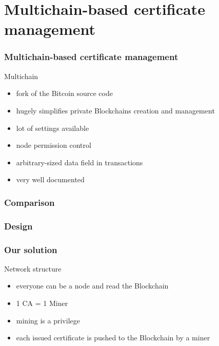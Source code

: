 \section[Multichain-based certificate verification]{Multichain-based certificate management}
\begin{frame}
\frametitle{Multichain-based certificate management}
\begin{alertblock}{Multichain}
	\begin{itemize}
		\item fork of the Bitcoin source code
		\item hugely simplifies private Blockchains creation and management
		\item lot of settings available
		\item node permission control
		\item arbitrary-sized data field in transactions
		\item very well documented
	\end{itemize}
\end{alertblock}
\end{frame}

\begin{frame}
	\frametitle{Comparison}
\end{frame}


\begin{frame}
	\frametitle{Design}
	\begin{center}
	\end{center}
\end{frame}

\begin{frame}
	\frametitle{Our solution}
	\begin{exampleblock}{Network structure}
		\begin{itemize}
			\item everyone can be a node and read the Blockchain
			\item 1 CA = 1 Miner
			\item mining is a privilege
			\item each issued certificate is pushed to the Blockchain by a miner
		\end{itemize}
	\end{exampleblock}
\end{frame}

